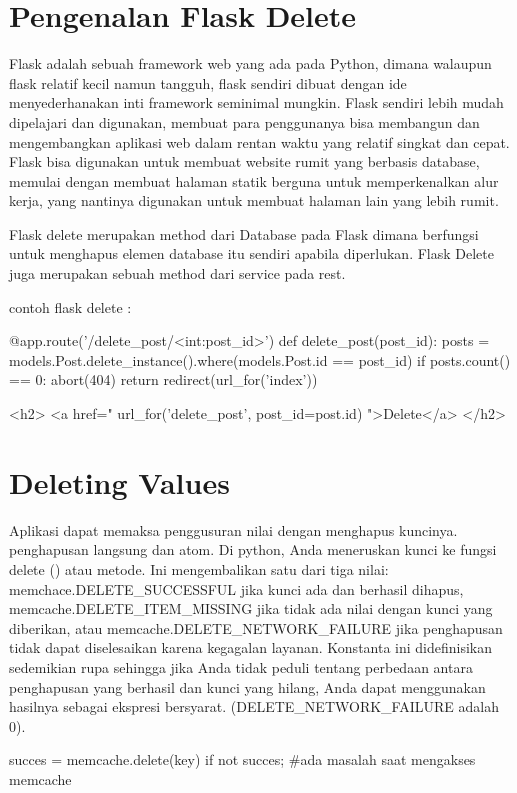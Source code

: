 \section{Pengenalan Flask Delete}
Flask adalah sebuah framework web yang ada pada Python, dimana walaupun flask relatif kecil namun tangguh, flask sendiri dibuat dengan ide menyederhanakan inti framework seminimal mungkin.  Flask sendiri lebih mudah dipelajari dan digunakan, membuat para penggunanya bisa membangun dan mengembangkan aplikasi web dalam rentan waktu yang relatif singkat dan cepat. Flask bisa digunakan  untuk membuat website rumit yang berbasis database, memulai dengan membuat halaman statik berguna untuk memperkenalkan alur kerja, yang nantinya digunakan untuk membuat halaman lain yang lebih rumit.

Flask delete merupakan method dari Database pada Flask dimana berfungsi untuk menghapus elemen database itu sendiri apabila diperlukan. Flask Delete juga merupakan
sebuah method dari service pada rest.

contoh flask delete :

@app.route('/delete_post/<int:post_id>')
def delete_post(post_id):
    posts = models.Post.delete_instance().where(models.Post.id == post_id)
    if posts.count() == 0:
        abort(404)
    return redirect(url_for('index'))


<h2>
    <a href="{{ url_for('delete_post', post_id=post.id) }}">Delete</a>
</h2>

\section{Deleting Values}
Aplikasi dapat memaksa penggusuran nilai dengan menghapus kuncinya. penghapusan langsung dan atom.
Di python, Anda meneruskan kunci ke fungsi delete () atau metode. Ini mengembalikan satu dari tiga nilai: memchace.DELETE_SUCCESSFUL jika kunci ada dan berhasil dihapus, memcache.DELETE_ITEM_MISSING jika tidak ada nilai dengan kunci yang diberikan, atau memcache.DELETE_NETWORK_FAILURE jika penghapusan tidak dapat diselesaikan karena kegagalan layanan. Konstanta ini didefinisikan sedemikian rupa sehingga jika Anda tidak peduli tentang perbedaan antara penghapusan yang berhasil dan kunci yang hilang, Anda dapat menggunakan hasilnya sebagai ekspresi bersyarat. (DELETE_NETWORK_FAILURE adalah 0)\cite{sanderson2015programming}.

		succes = memcache.delete(key)
		if not succes;
			#ada masalah saat mengakses memcache